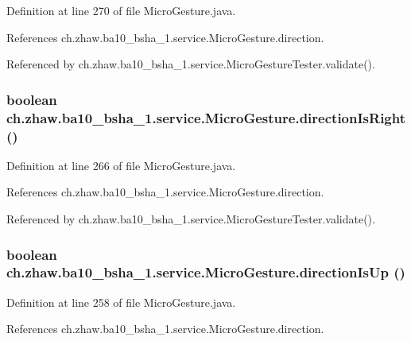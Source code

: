 Definition at line 270 of file MicroGesture.java.

References ch.zhaw.ba10\_\-bsha\_\-1.service.MicroGesture.direction.

Referenced by ch.zhaw.ba10\_\-bsha\_\-1.service.MicroGestureTester.validate().\hypertarget{classch_1_1zhaw_1_1ba10__bsha__1_1_1service_1_1MicroGesture_a265dca7b768b336a90d0177b1a299949}{
\subsubsection[{directionIsRight}]{\setlength{\rightskip}{0pt plus 5cm}boolean ch.zhaw.ba10\_\-bsha\_\-1.service.MicroGesture.directionIsRight ()}}
\label{classch_1_1zhaw_1_1ba10__bsha__1_1_1service_1_1MicroGesture_a265dca7b768b336a90d0177b1a299949}


Definition at line 266 of file MicroGesture.java.

References ch.zhaw.ba10\_\-bsha\_\-1.service.MicroGesture.direction.

Referenced by ch.zhaw.ba10\_\-bsha\_\-1.service.MicroGestureTester.validate().\hypertarget{classch_1_1zhaw_1_1ba10__bsha__1_1_1service_1_1MicroGesture_ac7b68d3f3a9efd30535baf0c60b9024f}{
\subsubsection[{directionIsUp}]{\setlength{\rightskip}{0pt plus 5cm}boolean ch.zhaw.ba10\_\-bsha\_\-1.service.MicroGesture.directionIsUp ()}}
\label{classch_1_1zhaw_1_1ba10__bsha__1_1_1service_1_1MicroGesture_ac7b68d3f3a9efd30535baf0c60b9024f}


Definition at line 258 of file MicroGesture.java.

References ch.zhaw.ba10\_\-bsha\_\-1.service.MicroGesture.direction.

